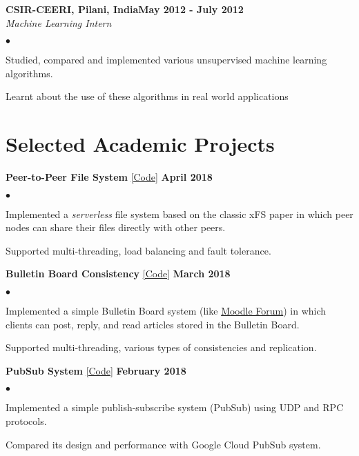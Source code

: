 \documentclass[margin,line]{res}
\newenvironment{list2}{
  \begin{list}{$\bullet$}{%
      \setlength{\itemsep}{0in}
      \setlength{\parsep}{0in} \setlength{\parskip}{0in}
      \setlength{\topsep}{0in} \setlength{\partopsep}{0in} 
      \setlength{\leftmargin}{0.2in}}}{\end{list}}
\begin{document}
\begin{resume}
{\bf CSIR-CEERI, Pilani, India}\hfill {\bf May 2012 - July 2012}\\
{\em Machine Learning Intern}
\vspace{.3cm}
\begin{list2}
\item Studied, compared and implemented various unsupervised machine learning algorithms.
\item Learnt about the use of these algorithms in real world applications
\end{list2}

\section{\sc Selected Academic Projects}

{\bf Peer-to-Peer File System} \href{https://github.com/kudhru/P2PFileSystem}{\color{blue}[Code]} \hfill {\bf April 2018}\\

\vspace{-.3cm}
\begin{list2}
	\item Implemented a \emph{serverless} file system based on the classic xFS paper in which peer nodes can share their files directly with other peers.
	\item Supported multi-threading, load balancing and fault tolerance.
\end{list2}

{\bf Bulletin Board Consistency} \href{https://github.com/kudhru/Bulletin-Board}{\color{blue}[Code]} \hfill {\bf March 2018}\\

\vspace{-.3cm}
\begin{list2}
	\item Implemented a simple Bulletin Board system (like \href{https://moodle.org}{\color{blue}Moodle Forum}) in which clients can post, reply, and read articles stored in the Bulletin Board.
	\item Supported multi-threading, various types of consistencies and replication.
\end{list2}

{\bf PubSub System} \href{https://github.com/kudhru/publish-subscribe-system}{\color{blue}[Code]} \hfill {\bf February 2018}\\

\vspace{-.3cm}
\begin{list2}
	\item Implemented a simple publish-subscribe system (PubSub) using UDP and RPC protocols.
	\item Compared its design and performance with Google Cloud PubSub system.
\end{list2}


\end{resume}
\end{document}
